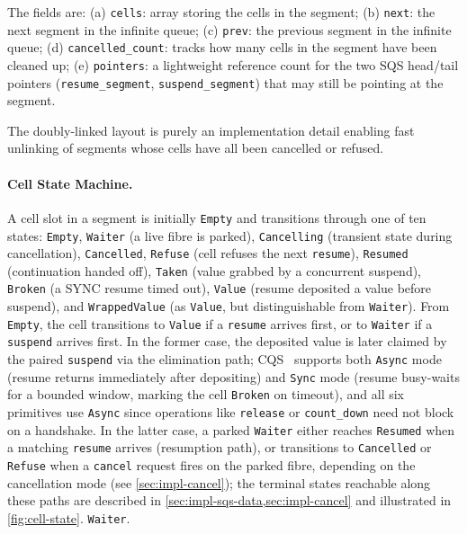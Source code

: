\documentclass[11pt,a4paper]{article}
\begin{document}
The fields are:
(a) \texttt{cells}: array storing the cells in the segment;
(b) \texttt{next}: the next segment in the infinite queue;
(c) \texttt{prev}: the previous segment in the infinite queue;
(d) \texttt{cancelled\_count}: tracks how many cells in the segment have
been cleaned up;
(e) \texttt{pointers}: a lightweight reference count for the two SQS
head/tail pointers (\texttt{resume\_segment}, \texttt{suspend\_segment})
that may still be pointing at the segment.

The doubly-linked layout is purely an implementation detail enabling
fast unlinking of segments whose cells have all been cancelled or
refused.

\paragraph{Cell State Machine.}
A cell slot in a segment is initially \texttt{Empty} and transitions through one of ten states: \texttt{Empty}, \texttt{Waiter} (a live fibre is parked), \texttt{Cancelling} (transient state during cancellation), \texttt{Cancelled}, \texttt{Refuse} (cell refuses the next \texttt{resume}), \texttt{Resumed} (continuation handed off), \texttt{Taken} (value grabbed by a concurrent suspend), \texttt{Broken} (a SYNC resume timed out), \texttt{Value} (resume deposited a value before suspend), and \texttt{WrappedValue} (as \texttt{Value}, but distinguishable from \texttt{Waiter}). From \texttt{Empty}, the cell transitions to \texttt{Value} if a \texttt{resume} arrives first, or to \texttt{Waiter} if a \texttt{suspend} arrives first. In the former case, the deposited value is later claimed by the paired \texttt{suspend} via the elimination path; CQS~\cite{koval2023cqs} supports both \texttt{Async} mode (resume returns immediately after depositing) and \texttt{Sync} mode (resume busy-waits for a bounded window, marking the cell \texttt{Broken} on timeout), and all six primitives use \texttt{Async} since operations like \texttt{release} or \texttt{count\_down} need not block on a handshake. In the latter case, a parked \texttt{Waiter} either reaches \texttt{Resumed} when a matching \texttt{resume} arrives (resumption path), or transitions to \texttt{Cancelled} or \texttt{Refuse} when a \texttt{cancel} request fires on the parked fibre, depending on the cancellation mode (see \cref{sec:impl-cancel}); the terminal states reachable along these paths are described in \cref{sec:impl-sqs-data,sec:impl-cancel} and illustrated in \cref{fig:cell-state}.
\texttt{Waiter}.
\end{document}
